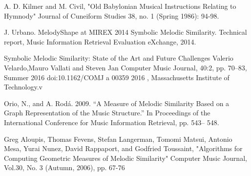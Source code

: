 \documentclass{llncs}
\begin{document}
	\begin{thebibliography}{5}
	
	A. D. Kilmer and M. Civil, 
	"Old Babylonian Musical Instructions Relating to Hymnody" 
	Journal of Cuneiform Studies 38, 
	no. 1 (Spring 1986): 94-98.

	J. Urbano. MelodyShape at 
	MIREX 2014 Symbolic Melodic Similarity. 
	Technical report, Music Information Retrieval Evaluation eXchange, 2014.

	Symbolic Melodic Similarity: State of the Art and Future Challenges
	Valerio Velardo,Mauro Vallati and Steven Jan
	Computer Music Journal, 40:2, pp. 70–83, Summer 2016 doi:10.1162/COMJ a 00359
	2016 , Massachusetts Institute of Technology.v

	 Orio, N., and A. Rodá. 2009. “A Measure of Melodic Similarity Based on a Graph Representation of the Music Structure.” In Proceedings of the International Conference for Music Information Retrieval, pp. 543– 548.


	 Greg Aloupis, Thomas Fevens, Stefan Langerman, Tomomi Matsui, Antonio Mesa, Yurai Nunez, David Rappaport, and Godfried Toussaint, "Algorithms for Computing Geometric Measures of Melodic Similarity" Computer Music Journal, Vol.30, No. 3 (Autumn, 2006), pp. 67-76

	\end{thebibliography}

	
\end{document}
